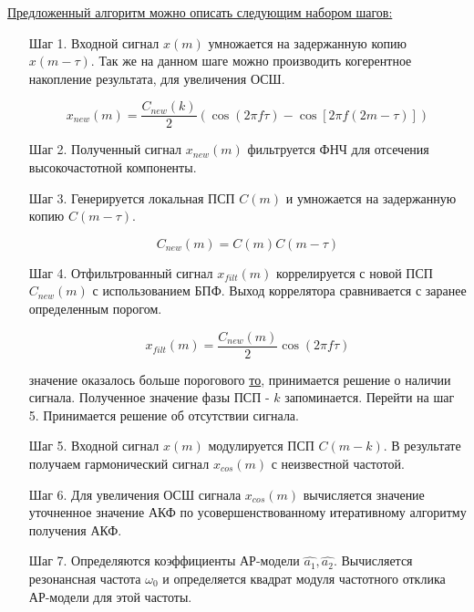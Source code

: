 {\underline{Предложенный алгоритм можно описать следующим набором шагов:}}
\begin{itemize}
\item[Шаг 1.] Входной сигнал ${x(m)}$ умножается на задержанную копию ${x(m-\tau)}$. Так же
	на данном шаге можно производить когерентное накопление результата, для
	увеличения ОСШ.

	\begin{center}
	\begin{equation}
		x_{new}(m) = \frac{C_{new}(k)}{2} \left(\cos (2\pi f \tau) - \cos \left[2 \pi f (2m - \tau)\right]\right)
	\end{equation}
	\end{center}

\item[Шаг 2.] Полученный сигнал ${x_{new}(m)}$ фильтруется ФНЧ для отсечения высокочастотной компоненты.
\item[Шаг 3.] Генерируется локальная ПСП ${C(m)}$ и умножается на задержанную копию ${C(m-\tau)}$.

	\begin{center}
	\begin{equation}
		C_{new}(m) = C(m)C(m-\tau)
	\end{equation}
	\end{center}

\item[Шаг 4.] Отфильтрованный сигнал ${x_{filt}(m)}$ коррелируется с новой ПСП ${C_{new}(m)}$
	с использованием БПФ. Выход коррелятора сравнивается с заранее определенным порогом.

	\begin{center}
	\begin{equation}
		x_{filt}(m) = \frac{C_{new}(m)}{2} \cos (2\pi f \tau)
	\end{equation}
	\end{center}

	  значение оказалось больше порогового {\underline{то}},
		принимается решение о наличии сигнала. Полученное значение фазы ПСП  - ${k}$ запоминается.
		Перейти на шаг 5.
		Принимается решение об отсутствии сигнала.
\item[Шаг 5.] Входной сигнал ${x(m)}$ модулируется ПСП ${C(m-k)}$. В результате получаем гармонический
	сигнал ${x_{cos}(m)}$ с неизвестной частотой.
\item[Шаг 6.] Для увеличения ОСШ сигнала ${x_{cos}(m)}$ вычисляется значение уточненное значение АКФ
	по усовершенствованному итеративному алгоритму получения АКФ.
\item[Шаг 7.] Определяются коэффициенты АР-модели ${\hat{a_1}, \hat{a_2}}$.
	Вычисляется резонансная частота ${\omega_0}$ и определяется квадрат модуля частотного отклика АР-модели для этой частоты. 
\end{itemize}

